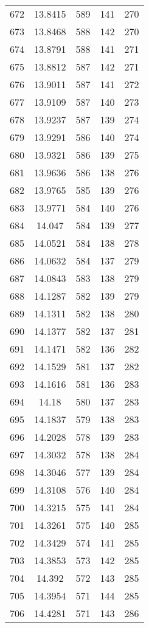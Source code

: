 \documentclass[12pt,a4paper]{article}
\begin{document}
\begin{tabular}{r|cccc}
	672 & 13.8415 & 589 & 141 & 270 \\
	673 & 13.8468 & 588 & 142 & 270 \\
	674 & 13.8791 & 588 & 141 & 271 \\
	675 & 13.8812 & 587 & 142 & 271 \\
	676 & 13.9011 & 587 & 141 & 272 \\
	677 & 13.9109 & 587 & 140 & 273 \\
	678 & 13.9237 & 587 & 139 & 274 \\
	679 & 13.9291 & 586 & 140 & 274 \\
	680 & 13.9321 & 586 & 139 & 275 \\
	681 & 13.9636 & 586 & 138 & 276 \\
	682 & 13.9765 & 585 & 139 & 276 \\
	683 & 13.9771 & 584 & 140 & 276 \\
	684 & 14.047 & 584 & 139 & 277 \\
	685 & 14.0521 & 584 & 138 & 278 \\
	686 & 14.0632 & 584 & 137 & 279 \\
	687 & 14.0843 & 583 & 138 & 279 \\
	688 & 14.1287 & 582 & 139 & 279 \\
	689 & 14.1311 & 582 & 138 & 280 \\
	690 & 14.1377 & 582 & 137 & 281 \\
	691 & 14.1471 & 582 & 136 & 282 \\
	692 & 14.1529 & 581 & 137 & 282 \\
	693 & 14.1616 & 581 & 136 & 283 \\
	694 & 14.18 & 580 & 137 & 283 \\
	695 & 14.1837 & 579 & 138 & 283 \\
	696 & 14.2028 & 578 & 139 & 283 \\
	697 & 14.3032 & 578 & 138 & 284 \\
	698 & 14.3046 & 577 & 139 & 284 \\
	699 & 14.3108 & 576 & 140 & 284 \\
	700 & 14.3215 & 575 & 141 & 284 \\
	701 & 14.3261 & 575 & 140 & 285 \\
	702 & 14.3429 & 574 & 141 & 285 \\
	703 & 14.3853 & 573 & 142 & 285 \\
	704 & 14.392 & 572 & 143 & 285 \\
	705 & 14.3954 & 571 & 144 & 285 \\
	706 & 14.4281 & 571 & 143 & 286 \\

\end{tabular}
\end{document}
